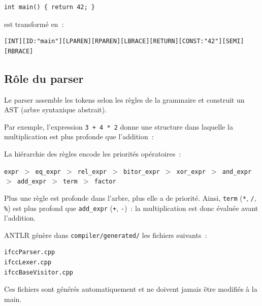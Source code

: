\documentclass[11pt,a4paper]{article}
\begin{document}
\begin{lstlisting}
int main() { return 42; }
\end{lstlisting}

est transformé en~:

\begin{lstlisting}
[INT][ID:"main"][LPAREN][RPAREN][LBRACE][RETURN][CONST:"42"][SEMI][RBRACE]
\end{lstlisting}

\subsection{Rôle du parser}

Le parser assemble les tokens selon les règles de la grammaire et construit un AST (arbre syntaxique abstrait).

Par exemple, l'expression \texttt{3 + 4 * 2} donne une structure dans laquelle la multiplication est plus profonde que l'addition~:

\begin{center}
\end{center}

La hiérarchie des règles encode les priorités opératoires~:

\begin{center}
\texttt{expr $>$ eq\_expr $>$ rel\_expr $>$ bitor\_expr $>$ xor\_expr $>$ and\_expr $>$ add\_expr $>$ term $>$ factor}
\end{center}

Plus une règle est profonde dans l'arbre, plus elle a de priorité. Ainsi, \texttt{term} (\texttt{*}, \texttt{/}, \texttt{\%}) est plus profond que \texttt{add\_expr} (\texttt{+}, \texttt{-})~: la multiplication est donc évaluée avant l'addition.

ANTLR génère dans \texttt{compiler/generated/} les fichiers suivants~:
\begin{lstlisting}
ifccParser.cpp
ifccLexer.cpp
ifccBaseVisitor.cpp
\end{lstlisting}

Ces fichiers sont générés automatiquement et ne doivent jamais être modifiés à la main.
\end{document}
